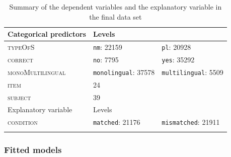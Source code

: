 \begin{table}\fontsize{10}{11}
\caption{Summary of the dependent variables and the explanatory variable in the final data set}
\label{tab:7.6}
\centering
\begin{tabular}{lllll} 
\lsptoprule
Categorical predictors & Levels & ~                               & ~ & ~                                     \\ 
\midrule
\textsc{typeOfS}                & \multicolumn{2}{l}{\texttt{nm}: 22159}            & \multicolumn{2}{l}{\texttt{pl}:
  20928}           \\
\textsc{correct}                & \multicolumn{2}{l}{\texttt{no}: 7795}             & \multicolumn{2}{l}{\texttt{yes}: 35292}            \\
\textsc{monoMultilingual}       & \multicolumn{2}{l}{\texttt{monolingual}:
  37578} & \multicolumn{2}{l}{\texttt{multilingual}:
  5509}  \\
\textsc{item}                   & 24     & ~                               & ~ & ~                                     \\
\textsc{subject}                & 39     & ~                               & ~ & ~                                     \\ 
\midrule
Explanatory variable   & Levels & ~                               & ~ & ~                                     \\ 
\midrule
\textsc{condition}              & \multicolumn{2}{l}{\texttt{matched}:
  21176}     & \multicolumn{2}{l}{\texttt{mismatched}:
  21911}   \\
\lspbottomrule
\end{tabular}
\end{table}

\subsubsection{Fitted models}\label{section07_2_2_2}

